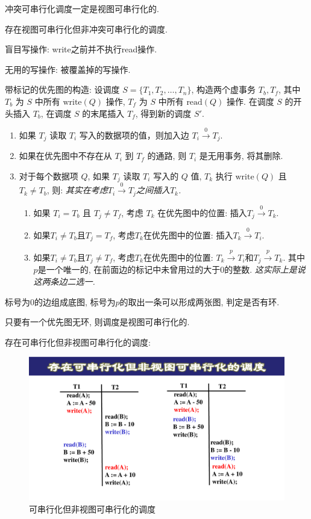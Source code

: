 \begin{corollary}
  冲突可串行化调度一定是视图可串行化的.
\end{corollary}

\begin{corollary}
  存在视图可串行化但非冲突可串行化的调度.
\end{corollary}

盲目写操作: write之前并不执行read操作.

无用的写操作: 被覆盖掉的写操作.

带标记的优先图的构造:
设调度 $ S = \{ T_1, T_2, \ldots, T_n \} $, 构造两个虚事务 $ T_b, T_f $, 
其中 $ T_b $ 为 $ S $ 中所有 $ \text{write}(Q) $ 操作, 
$ T_f $ 为 $ S $ 中所有 $ \text{read}(Q) $ 操作. 
在调度 $ S $ 的开头插入 $ T_b $, 在调度 $ S $ 的末尾插入 $ T_f $, 得到新的调度 $ S' $.
\begin{enumerate}
    \item 如果 $ T_j $ 读取 $ T_i $ 写入的数据项的值，则加入边 $ T_i \overset{0}{\to} T_j $.
    \item 如果在优先图中不存在从 $ T_i $ 到 $ T_f $ 的通路, 则 $ T_i $ 是无用事务, 将其删除.
    \item 对于每个数据项 $ Q $, 如果 $ T_j $ 读取 $ T_i $ 写入的 $ Q $ 值, $ T_k $ 执行 $ \text{write}(Q) $ 且 $ T_k \neq T_b $, 则: \textit{其实在考虑$T_i \overset{0}{\to} T_j$之间插入$T_k$.}
    \begin{enumerate}
        \item 如果 $ T_i = T_b $ 且 $ T_j \neq T_f $, 考虑 $ T_k $ 在优先图中的位置: 插入$T_j\overset{0}{\to}T_k$.
        \item 如果$T_i\neq T_b$且$T_j=T_f$, 考虑$T_k$在优先图中的位置: 插入$T_k\overset{0}{\to} T_i$.
        \item 如果$T_i\neq T_b$且$T_j\neq T_f$, 考虑$T_k$在优先图中的位置: $T_k\overset{p}{\to} T_i$和$T_j\overset{p}{\to} T_k$. 其中$p$是一个唯一的, 在前面边的标记中未曾用过的大于0的整数.
        \textit{这实际上是说这两条边二选一.}
    \end{enumerate}
\end{enumerate}
标号为0的边组成底图, 标号为$p$的取出一条可以形成两张图, 判定是否有环.

\begin{theorem}[视图可串行化判定准则]
  只要有一个优先图无环, 则调度是视图可串行化的.
\end{theorem}

存在可串行化但非视图可串行化的调度:
\begin{figure}[H]
    \centering
    \includegraphics[width=.7\textwidth]{./figure/可串行化.pdf}
    \caption{可串行化但非视图可串行化的调度}
\end{figure}

